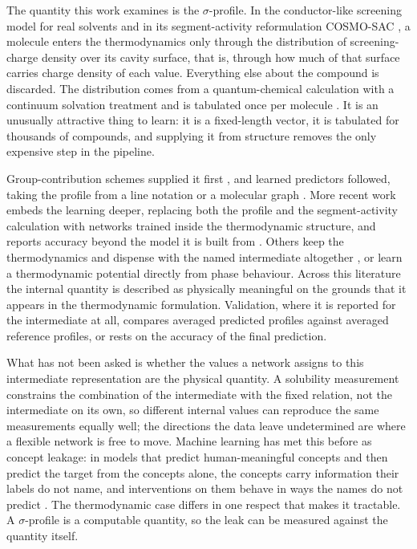 The quantity this work examines is the $\sigma$-profile. In the conductor-like screening model for
real solvents and in its segment-activity reformulation COSMO-SAC \cite{lin2002}, a molecule
enters the thermodynamics only through the distribution of screening-charge density over its
cavity surface, that is, through how much of that surface carries charge density of each value.
Everything else about the compound is discarded. The distribution comes from a quantum-chemical
calculation with a continuum solvation treatment and is tabulated once per molecule
\cite{mullins2006}. It is an unusually attractive thing to learn: it is a fixed-length vector, it
is tabulated for thousands of compounds, and supplying it from structure removes the only
expensive step in the pipeline.

Group-contribution schemes supplied it first \cite{mu2007gc,mu2009gc}, and learned predictors
followed, taking the profile from a line notation or a molecular graph
\cite{kang2022surrogate,chen2021transformer,zhang2022mpnn}. More recent work embeds the learning
deeper, replacing both the profile and the segment-activity calculation with networks trained
inside the thermodynamic structure, and reports accuracy beyond the model it is built from
\cite{yang2025tennet}. Others keep the thermodynamics and dispense with the named intermediate
altogether \cite{specht2024hanna}, or learn a thermodynamic potential directly from phase
behaviour. Across this literature the internal quantity is described as physically meaningful on
the grounds that it appears in the thermodynamic formulation. Validation, where it is reported for
the intermediate at all, compares averaged predicted profiles against averaged reference profiles,
or rests on the accuracy of the final prediction.

What has not been asked is whether the values a network assigns to this intermediate
representation are the physical quantity. A solubility measurement constrains the combination of
the intermediate with the fixed relation, not the intermediate on its own, so different internal
values can reproduce the same measurements equally well; the directions the data leave
undetermined are where a flexible network is free to move. Machine learning has met this before as
concept leakage: in models that predict human-meaningful concepts and then predict the target from
the concepts alone, the concepts carry information their labels do not name, and interventions on
them behave in ways the names do not predict
\cite{koh2020cbm,margeloiu2021,mahinpei2021,havasi2022}. The thermodynamic case differs in one
respect that makes it tractable. A $\sigma$-profile is a computable quantity, so the leak can be
measured against the quantity itself.

